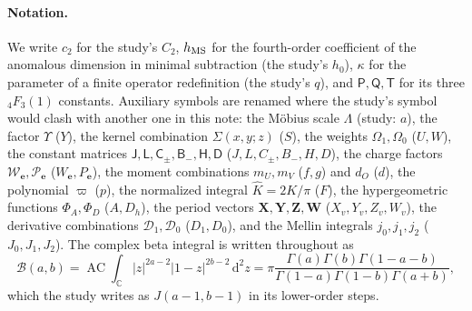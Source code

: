 \documentclass[11pt,a4paper]{article}
\numberwithin{equation}{section}
\newcommand{\dd}{\,\mathrm d}
\newcommand{\AC}{\operatorname{AC}}
\newcommand{\hMS}{h_{\rm MS}}
\begin{document}
\paragraph{Notation.} We write $c_2$ for the study's $C_2$, $\hMS$ for the fourth-order coefficient of the anomalous
dimension in minimal subtraction (the study's $h_0$), $\kappa$ for the parameter of a finite operator redefinition (the
study's $q$), and $\mathsf P,\mathsf Q,\mathsf T$ for its three ${}_4F_3(1)$ constants. Auxiliary symbols are
renamed where the study's symbol would clash with another one in this note: the M\"obius scale $\Lambda$ (study: $a$), the factor $\Upsilon$
($Y$), the kernel combination $\Sigma(x,y;z)$ ($S$), the weights $\Omega_1,\Omega_0$ ($U,W$), the constant matrices
$\mathsf J,\mathsf L,\mathsf C_\pm,\mathsf B_-,\mathsf H,\mathsf D$ ($J,L,C_\pm,B_-,H,D$), the charge factors
$\mathcal W_{\boldsymbol e},\mathcal P_{\boldsymbol e}$ ($W_{\boldsymbol e},P_{\boldsymbol e}$), the moment combinations
$m_U,m_V$ ($f,g$) and $d_O$ ($d$), the polynomial $\varpi$ ($p$), the normalized integral $\hat K=2K/\pi$ ($F$), the
hypergeometric functions $\Phi_A,\Phi_D$ ($A,D_h$), the period vectors $\mathbf X,\mathbf Y,\mathbf Z,\mathbf W$
($X_v,Y_v,Z_v,W_v$), the derivative combinations $\mathcal D_1,\mathcal D_0$ ($D_1,D_0$), and the Mellin integrals
$j_0,j_1,j_2$ ($J_0,J_1,J_2$). The complex beta integral is written throughout as
\begin{equation}
 \mathcal B(a,b)=\AC\!\int_{\mathbb C}|z|^{2a-2}|1-z|^{2b-2}\dd^2z
 =\pi\frac{\Gamma(a)\Gamma(b)\Gamma(1-a-b)}{\Gamma(1-a)\Gamma(1-b)\Gamma(a+b)},
 \label{eq:cform:beta}
\end{equation}
which the study writes as $J(a-1,b-1)$ in its lower-order steps.

\end{document}

